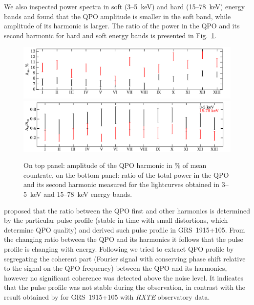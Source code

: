 \documentclass[a4paper,fleqn,usenatbib]{mnras}
\begin{document}
We also inspected power spectra in soft (3--5~keV) and hard (15--78~keV) energy bands and found that the QPO amplitude is smaller in the soft band, while amplitude of its harmonic is larger.
The ratio of the power in the QPO and its second harmonic for hard and soft energy bands is presented in Fig.~\ref{fig:qpo_ratio}.
\begin{figure}
\includegraphics[width=\columnwidth]{Q_ampl2.pdf}
\includegraphics[width=\columnwidth]{QPO_and_harmonic_ratio_ylabel.pdf}
        \caption{On top panel: amplitude of the QPO harmonic in \% of mean countrate, on the bottom panel: ratio of the total power in the QPO and its second harmonic measured for the lightcurves obtained in 3--5~keV and 15--78~keV energy bands.}
        \label{fig:qpo_ratio}
\end{figure}
\citet{2015MNRAS.446.3516I} proposed that the ratio between the QPO first and other harmonics is determined by the particular pulse profile (stable in time with small distortions, which determine QPO quality) and derived such pulse profile in GRS~1915+105.
From the changing ratio between the QPO and its harmonics it follows that the pulse profile is changing with energy. 
Following \citet{2015MNRAS.446.3516I} we tried to extract QPO profile by segregating the coherent part (Fourier signal with conserving phase shift relative to the signal on the QPO frequency) between the QPO and its harmonics, however no significant coherence was detected above the noise level.
It indicates that the pulse profile was not stable during the observation, in contrast with the result obtained by \citet{2015MNRAS.446.3516I} for GRS~1915+105 with {\it RXTE} observatory data.
\end{document}
